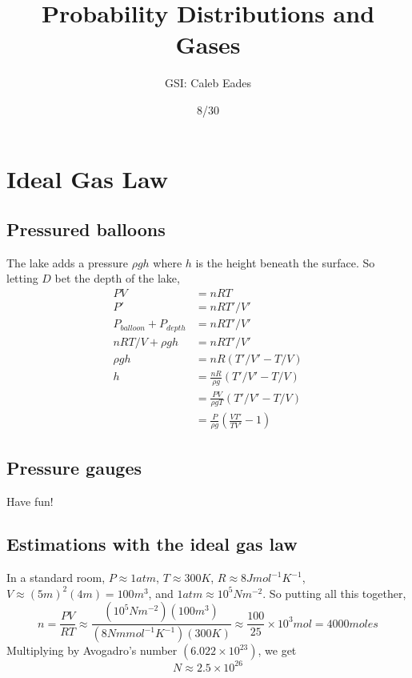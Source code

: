 \documentclass{article}
\begin{document}
	
\title{Probability Distributions and Gases}
\author{GSI: Caleb Eades}
\date{8/30}
\maketitle

\section{Ideal Gas Law}

\subsection{Pressured balloons}

The lake adds a pressure $\rho gh$ where $h$ is the height beneath the surface. So letting $D$ bet the depth of the lake,
\begin{align*}
PV &= nRT \\
P' &= nRT'/V' \\
P_{balloon} + P_{depth} &= nRT'/V' \\
nRT/V + \rho gh &= nRT'/V' \\
\rho gh &= nR(T'/V'-T/V) \\
h &= \frac{nR}{\rho g}(T'/V'-T/V) \\
&= \frac{PV}{\rho gT}(T'/V'-T/V) \\
&= \frac{P}{\rho g}\left(\frac{VT'}{TV'}-1\right)
\end{align*}

\subsection{Pressure gauges}

Have fun!

\subsection{Estimations with the ideal gas law}

In a standard room, $P\approx 1 atm$, $T \approx 300 K$, $R\approx 8 J mol^{-1} K^{-1}$, $V\approx (5 m)^2(4 m) = 100 m^3$, and $1 atm\approx 10^5 N m^{-2}$. So putting all this together,
\begin{equation}
n = \frac{PV}{RT} \approx \frac{(10^5 N m^{-2})(100 m^3)}{(8 N m mol^{-1} K^{-1})(300 K)} \approx \frac{100}{25}\times 10^3 mol = 4000 moles
\end{equation}
Multiplying by Avogadro's number $\left(6.022\times10^{23}\right)$, we get
\begin{equation}
N\approx 2.5\times10^{26}
\end{equation}
\end{document}
